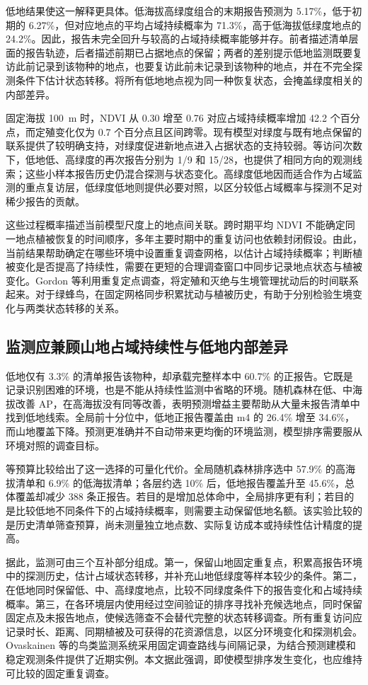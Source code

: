 低地结果使这一解释更具体。低海拔高绿度组合的末期报告预测为 5.17\%，低于初期的 6.27\%，但对应地点的平均占域持续概率为 71.3\%，高于低海拔低绿度地点的 24.2\%。因此，报告未完全回升与较高的占域持续概率能够并存。前者描述清单层面的报告轨迹，后者描述前期已占据地点的保留；两者的差别提示低地监测既要复访此前记录到该物种的地点，也要复访此前未记录到该物种的地点，并在不完全探测条件下估计状态转移。将所有低地地点视为同一种恢复状态，会掩盖绿度相关的内部差异。

固定海拔 100~m 时，NDVI 从 0.30 增至 0.76 对应占域持续概率增加 42.2 个百分点，而定殖变化仅为 0.7 个百分点且区间跨零。现有模型对绿度与既有地点保留的联系提供了较明确支持，对绿度促进新地点进入占据状态的支持较弱。等访问次数下，低地低、高绿度的再次报告分别为 1/9 和 15/28，也提供了相同方向的观测线索；这些小样本报告历史仍混合探测与状态变化。高绿度低地因而适合作为占域监测的重点复访层，低绿度低地则提供必要对照，以区分较低占域概率与探测不足对稀少报告的贡献。

这些过程概率描述当前模型尺度上的地点间关联。跨时期平均 NDVI 不能确定同一地点植被恢复的时间顺序，多年主要时期中的重复访问也依赖封闭假设。由此，当前结果帮助确定在哪些环境中设置重复调查网格，以估计占域持续概率；判断植被变化是否提高了持续性，需要在更短的合理调查窗口中同步记录地点状态与植被变化。Gordon 等\cite{gordon2024}利用重复定点调查，将定殖和灭绝与生境管理扰动后的时间联系起来。对于绿蜂鸟，在固定网格同步积累扰动与植被历史，有助于分别检验生境变化与两类状态转移的关系。

\subsection{监测应兼顾山地占域持续性与低地内部差异}
低地仅有 3.3\% 的清单报告该物种，却承载完整样本中 60.7\% 的正报告。它既是记录识别困难的环境，也是不能从持续性监测中省略的环境。随机森林在低、中海拔改善 AP，在高海拔没有同等改善，表明预测增益主要帮助从大量未报告清单中找到低地线索。全局前十分位中，低地正报告覆盖由 m4 的 26.4\% 增至 34.6\%，而山地覆盖下降。预测更准确并不自动带来更均衡的环境监测，模型排序需要服从环境对照的调查目标。

等预算比较给出了这一选择的可量化代价。全局随机森林排序选中 57.9\% 的高海拔清单和 6.9\% 的低海拔清单；各层约选 10\% 后，低地报告覆盖升至 45.6\%，总体覆盖却减少 388 条正报告。若目的是增加总体命中，全局排序更有利；若目的是比较低地不同条件下的占域持续概率，则需要主动保留低地名额。该实验比较的是历史清单筛查预算，尚未测量独立地点数、实际复访成本或持续性估计精度的提高。

据此，监测可由三个互补部分组成。第一，保留山地固定重复点，积累高报告环境中的探测历史，估计占域状态转移，并补充山地低绿度等样本较少的条件。第二，在低地同时保留低、中、高绿度地点，比较不同绿度条件下的报告变化和占域持续概率。第三，在各环境层内使用经过空间验证的排序寻找补充候选地点，同时保留固定点及未报告地点，使候选筛查不会替代完整的状态转移调查。所有重复访问应记录时长、距离、同期植被及可获得的花资源信息，以区分环境变化和探测机会。Ovaskainen 等\cite{ovaskainen2026}的鸟类监测系统采用固定调查路线与间隔记录，为结合预测建模和稳定观测条件提供了近期实例。本文据此强调，即使模型排序发生变化，也应维持可比较的固定重复调查。

